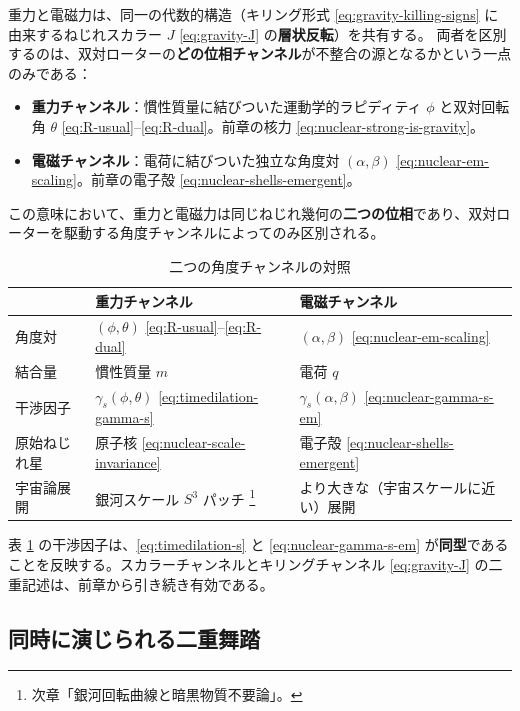 \documentclass[dvipdfmx,a4paper,oneside]{jsbook}
\numberwithin{equation}{chapter}
\begin{document}
重力と電磁力は、同一の代数的構造（キリング形式 \eqref{eq:gravity-killing-signs} に由来するねじれスカラー \(J\) \eqref{eq:gravity-J} の\textbf{層状反転}）を共有する。
両者を区別するのは、双対ローターの\textbf{どの位相チャンネル}が不整合の源となるかという一点のみである：
\begin{itemize}[leftmargin=2em]
  \item \textbf{重力チャンネル}：慣性質量に結びついた運動学的ラピディティ \(\phi\) と双対回転角 \(\theta\) \eqref{eq:R-usual}–\eqref{eq:R-dual}。前章の核力 \eqref{eq:nuclear-strong-is-gravity}。
  \item \textbf{電磁チャンネル}：電荷に結びついた独立な角度対 \((\alpha, \beta)\) \eqref{eq:nuclear-em-scaling}。前章の電子殻 \eqref{eq:nuclear-shells-emergent}。
\end{itemize}

この意味において、重力と電磁力は同じねじれ幾何の\textbf{二つの位相}であり、双対ローターを駆動する角度チャンネルによってのみ区別される。

\begin{table}[htbp]
  \centering
  \caption{二つの角度チャンネルの対照}
  \label{tab:two-channels}
  \begin{tabular}{@{}lll@{}}
    \toprule
    & 重力チャンネル & 電磁チャンネル \\
    \midrule
    角度対 & \((\phi, \theta)\) \eqref{eq:R-usual}–\eqref{eq:R-dual} & \((\alpha, \beta)\) \eqref{eq:nuclear-em-scaling} \\
    結合量 & 慣性質量 \(m\) & 電荷 \(q\) \\
    干渉因子 & \(\gamma_s(\phi, \theta)\) \eqref{eq:timedilation-gamma-s} & \(\gamma_s(\alpha, \beta)\) \eqref{eq:nuclear-gamma-s-em} \\
    原始ねじれ星 & 原子核 \eqref{eq:nuclear-scale-invariance} & 電子殻 \eqref{eq:nuclear-shells-emergent} \\
    宇宙論展開 & 銀河スケール \(S^3\) パッチ \footnote{次章「銀河回転曲線と暗黒物質不要論」。} & より大きな（宇宙スケールに近い）展開 \\
    \bottomrule
  \end{tabular}
\end{table}

表 \ref{tab:two-channels} の干渉因子は、\eqref{eq:timedilation-s} と \eqref{eq:nuclear-gamma-s-em} が\textbf{同型}であることを反映する。スカラーチャンネルとキリングチャンネル \eqref{eq:gravity-J} の二重記述は、前章から引き続き有効である。

\subsection{同時に演じられる二重舞踏}
\end{document}
